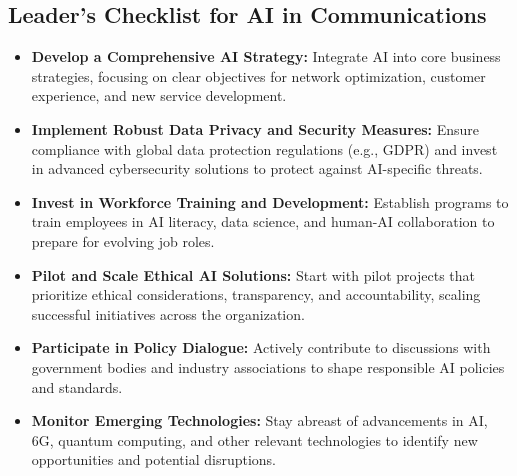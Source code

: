 \subsection{Leader's Checklist for AI in Communications}

\begin{itemize}
    \item \textbf{Develop a Comprehensive AI Strategy:}
Integrate AI into core business strategies, focusing on clear objectives for network optimization, customer experience, and new service development.
    \item \textbf{Implement Robust Data Privacy and Security Measures:}
Ensure compliance with global data protection regulations (e.g., GDPR) and invest in advanced cybersecurity solutions to protect against AI-specific threats.
    \item \textbf{Invest in Workforce Training and Development:}
Establish programs to train employees in AI literacy, data science, and human-AI collaboration to prepare for evolving job roles.
    \item \textbf{Pilot and Scale Ethical AI Solutions:}
Start with pilot projects that prioritize ethical considerations, transparency, and accountability, scaling successful initiatives across the organization.
    \item \textbf{Participate in Policy Dialogue:}
Actively contribute to discussions with government bodies and industry associations to shape responsible AI policies and standards.
    \item \textbf{Monitor Emerging Technologies:}
Stay abreast of advancements in AI, 6G, quantum computing, and other relevant technologies to identify new opportunities and potential disruptions.
\end{itemize}
